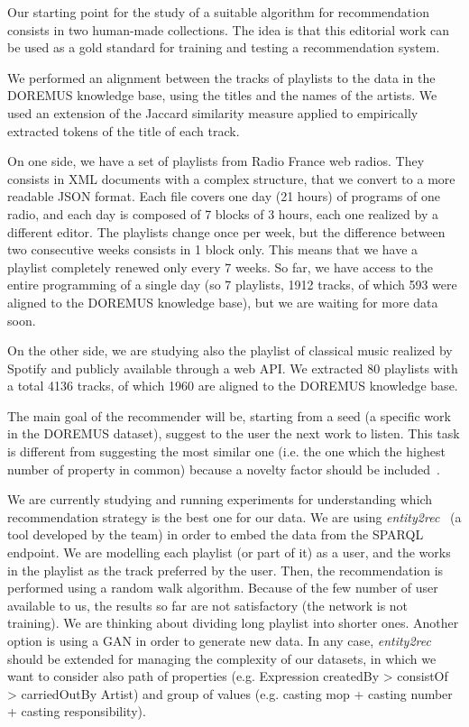\documentclass[a4paper,11pt]{report}
\begin{document}
Our starting point for the study of a suitable algorithm for recommendation consists in two human-made collections. The idea is that this editorial work can be used as a gold standard for training and testing a recommendation system.

We performed an alignment between the tracks of playlists to the data in the DOREMUS knowledge base, using the titles and the names of the artists. We used an extension of the Jaccard similarity measure applied to empirically extracted tokens of the title of each track.

On one side, we have a set of playlists from Radio France web radios. They consists in XML documents with a complex structure, that we convert to a more readable JSON format. Each file covers one day (21 hours) of programs of one radio, and each day is composed of 7 blocks of 3 hours, each one realized by a different editor.
The playlists change once per week, but the difference between two consecutive weeks consists in 1 block only. This means that we have a playlist completely renewed only every 7 weeks. So far, we have access to the entire programming of a single day (so 7 playlists, 1912 tracks, of which 593 were aligned to the DOREMUS knowledge base), but we are waiting for more data soon. 

On the other side, we are studying also the playlist of classical music realized by Spotify and publicly available through a web API. We extracted 80 playlists with a total 4136 tracks, of which 1960 are aligned to the DOREMUS knowledge base.

The main goal of the recommender will be, starting from a seed (a specific work in the DOREMUS dataset), suggest to the user the next work to listen. This task is different from suggesting the most similar one (i.e. the one which the highest number of property in common) because a novelty factor should be included~\cite{celma2009music}.

We are currently studying and running experiments for understanding which recommendation strategy is the best one for our data. We are using \textit{entity2rec}~\cite{palumbo2017entity2rec} (a tool developed by the team) in order to embed the data from the SPARQL endpoint. We are modelling each playlist (or part of it) as a user, and the works in the playlist as the track preferred by the user. Then, the recommendation is performed using a random walk algorithm. Because of the few number of user available to us, the results so far are not satisfactory (the network is not training). We are thinking about dividing long playlist into shorter ones. Another option is using a GAN in order to generate new data. In any case, \textit{entity2rec} should be extended for managing the complexity of our datasets, in which we want to consider also path of properties (e.g. Expression createdBy > consistOf > carriedOutBy Artist) and group of values (e.g. casting mop + casting number + casting responsibility).
\end{document}
